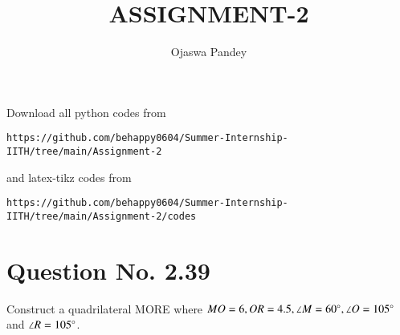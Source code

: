\documentclass[journal,12pt,twocolumn]{IEEEtran}
\begin{document}
     \def\topbox#1{\raisebox{-\baselineskip}[0in][0in]{#1}}
     \def\midbox#1{\raisebox{-0.5\baselineskip}[0in][0in]{#1}}
\vspace{3cm}
\title{ASSIGNMENT-2}
\author{Ojaswa Pandey}
\maketitle
\newpage
\bigskip
\renewcommand{\thefigure}{\theenumi}
\renewcommand{\thetable}{\theenumi}
Download all python codes from 
\begin{lstlisting}
https://github.com/behappy0604/Summer-Internship-IITH/tree/main/Assignment-2
\end{lstlisting}
%
and latex-tikz codes from 
%
\begin{lstlisting}
https://github.com/behappy0604/Summer-Internship-IITH/tree/main/Assignment-2/codes
\end{lstlisting}
%
\section{Question No. 2.39}
Construct a quadrilateral MORE where $MO = 6, OR = 4.5, \angle M = 60 \degree, \angle O = 105 \degree$ and $\angle R = 105 \degree$.
%
\end{document}
